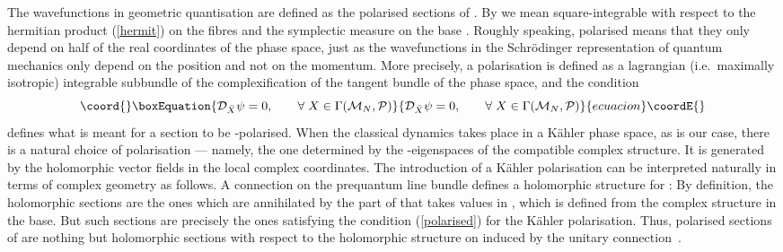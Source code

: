 \documentclass[a4paper,11pt]{article}
\begin{document}
The wavefunctions in geometric quantisation are defined as the
\coordHE{} polarised sections of \coordHE{}. By \coordHE{} we mean
square-integrable with respect to the hermitian product (\ref{hermit})
on the fibres and the symplectic measure \coordHE{} 
on the base \coordHE{}.
Roughly speaking, polarised means that they only depend on half of
the real coordinates of the phase space, just as the wavefunctions in
the Schr\"odinger representation of quantum mechanics only depend on
the position and not on the momentum. More precisely, a polarisation 
\coordHE{} is defined as a lagrangian (i.e.~maximally isotropic)
integrable subbundle of the complexification \coordHE{}
of the tangent bundle of the phase space, 
and the condition
\begin{equation}\coord{}\boxEquation{\label{polarised}
{\cal D}_{\bar{X}}\psi=0,\;\;\;\;\;\;\;
\forall \;X\in \Gamma({\cal M}_{N},{\cal P})
}{{\cal D}_{\bar{X}}\psi=0,\;\;\;\;\;\;\;
\forall \;X\in \Gamma({\cal M}_{N},{\cal P})
}{ecuacion}\coordE{}\end{equation}
defines what is meant for a section \myHighlight{$\psi$}\coordHE{} to be 
\coordHE{}-polarised. 
When the classical dynamics takes place in a K\"ahler phase space, as
is our case, there is a natural choice of polarisation \coordHE{} --- 
namely, the
one determined by the \coordHE{}-eigenspaces of the compatible complex 
structure. It is generated by the holomorphic vector fields
in the local complex coordinates.
The introduction of a K\"ahler polarisation can be interpreted 
naturally in terms of complex geometry as
follows. A connection on the prequantum line bundle defines a
holomorphic structure for \coordHE{}: By definition, the holomorphic sections
are the ones which are annihilated by the part of \coordHE{} that
takes values in \coordHE{}, which is defined
from the complex structure in the base. But such sections are
precisely the ones satisfying the condition (\ref{polarised}) for the
K\"ahler polarisation.
Thus, polarised sections of \coordHE{} are nothing but holomorphic sections
with respect to the holomorphic structure on \coordHE{} induced by the
unitary connection~\coordHE{}.
\end{document}
